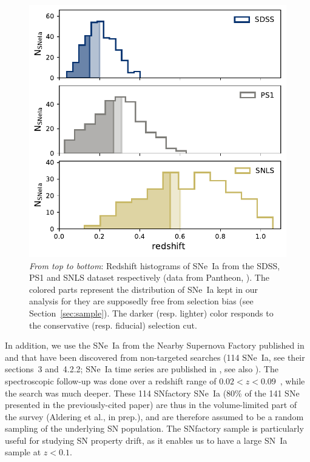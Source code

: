 \documentclass[]{aa}
\newcommand{\nn}[1]{\textcolor[rgb]{0.25, 0.50, 0}{#1}}
\begin{document}
\begin{figure}
    \centering
    \includegraphics[width=0.95\linewidth]{Article_figures/hist_surveys_cuts_55-cividis.pdf}
    \caption{\textit{From top to bottom}: Redshift histograms of SNe~Ia from
        the SDSS, PS1 and SNLS dataset respectively (data from Pantheon,
        \citealt{scolnic2018a}). The colored parts represent the distribution
        of SNe~Ia kept in our analysis for they are supposedly free from
        selection bias (see Section~\ref{sec:sample}). The darker (resp. lighter)
        color responds to the conservative (resp. fiducial) selection cut.}
    \label{fig:cuts}
\end{figure}

In addition, we use the SNe~Ia from the Nearby Supernova Factory
\citep[SNfactory,][]{aldering2002} published in \cite{rigault2018} and that have
been discovered from non-targeted searches (114 SNe~Ia, see their sections~3
and~4.2.2; SNe~Ia time series are published in \citealt{saunders2020}, see also
\citealt{aldering2020}). The spectroscopic follow-up was done over a redshift
range of $0.02 < z < 0.09$~\citep[as in][]{rigault2018}, while the search was
much deeper. These 114 SNfactory SNe~Ia \nn{(80\% of the 141 SNe presented in
the previously-cited paper)} are thus in the volume-limited part of the
survey (Aldering et al., in prep.), and are therefore assumed to be a random
sampling of the underlying SN population. The SNfactory sample is
particularly useful for studying SN property drift, as it enables us to have
a large SN~Ia sample at $z<0.1$. 
\end{document}
